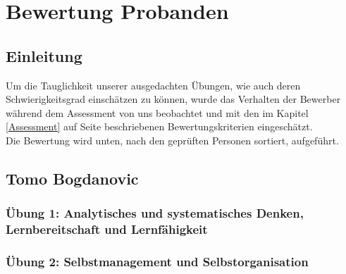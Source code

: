 \chapter{Bewertung Probanden}
\section{Einleitung}
Um die Tauglichkeit unserer ausgedachten Übungen, wie auch deren Schwierigkeitsgrad einschätzen zu können, wurde das Verhalten der Bewerber während dem  Assessment von uns beobachtet und mit den im Kapitel \ref{Assessment} auf Seite \pageref{Assessment} beschriebenen Bewertungskriterien eingeschätzt.\\
Die Bewertung wird unten, nach den geprüften Personen sortiert, aufgeführt.

\section{Tomo Bogdanovic}
\subsection{Übung 1: Analytisches und systematisches Denken, Lernbereitschaft und Lernfähigkeit}

\subsection{Übung 2: Selbstmanagement und Selbstorganisation}
